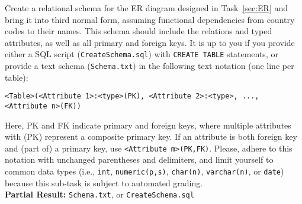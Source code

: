 \documentclass[
        a4paper,
        pdftex,
        english, 
        oneside,%
        listof=totoc,%
        bibliography=totoc, %
        titlepage,
        abstracton 
]{scrartcl} %
\begin{document}
Create a relational schema for the ER diagram designed in Task~\ref{sec:ER} and bring it into third normal form, assuming functional dependencies from country codes to their names.
This schema should include the relations and typed attributes, as well as all primary and foreign keys.
It is up to you if you provide either a SQL script (\texttt{CreateSchema.sql}) with \texttt{CREATE TABLE} statements, or provide a text schema (\texttt{Schema.txt}) in the following text notation (one line per table):
\begin{verbatim}
<Table>(<Attribute 1>:<type>(PK), <Attribute 2>:<type>, ..., <Attribute n>(FK))
\end{verbatim}
Here, PK and FK indicate primary and foreign keys, where multiple attributes with (PK) represent a composite primary key. If an attribute is both foreign key and (part of) a primary key, use \texttt{<Attribute m>(PK,FK)}. Please, adhere to this notation with unchanged parentheses and delimiters, and limit yourself to common data types (i.e., \texttt{int}, \texttt{numeric(p,s)}, \texttt{char(n)}, \texttt{varchar(n)}, or \texttt{date}) because this sub-task is subject to automated grading.\\

\noindent \textbf{Partial Result:} \texttt{Schema.txt}, or \texttt{CreateSchema.sql}

\bigskip
\end{document}
